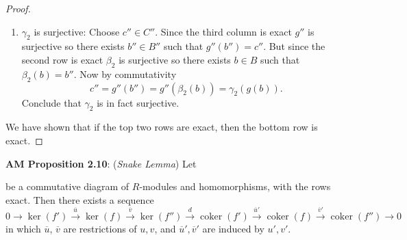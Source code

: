 \documentclass[8pt]{amsart}
\theoremstyle{plain}%
\theoremstyle{definition}
\theoremstyle{remark}
\numberwithin{equation}{section}
\newcommand{\coker}{\operatorname{coker}}
\begin{document}
\begin{proof}
\begin{enumerate}
			\item $\gamma_2$ is surjective: Choose $c'' \in C''$. Since the third column is exact $g''$ is surjective so there exists $b'' \in B''$ such that $g''(b'') = c''$. But since the second row is exact $\beta_2$ is surjective so there exists $b \in B$ such that $\beta_2(b) = b''$. Now by commutativity $$c'' = g''(b'') = g''(\beta_2(b)) = \gamma_2(g(b)).$$ Conclude that $\gamma_2$ is in fact surjective.
		\end{enumerate}
		We have shown that if the top two rows are exact, then the bottom row is exact.
	\end{proof}






\textbf{AM Proposition 2.10}: (\textit{Snake Lemma}) Let

	\begin{center}
	\end{center}

be a commutative diagram of $R$-modules and homomorphisms, with the rows exact. Then there exists a sequence $$0 \rightarrow \ker(f') \xrightarrow{\overline u} \ker(f) \xrightarrow{\overline v} \ker (f'') \xrightarrow d \coker(f') \xrightarrow {\overline u'} \coker (f) \xrightarrow{\overline v'} \coker(f'') \rightarrow 0$$ in which $\overline u$, $\overline v$ are restrictions of $u, v$, and $\overline u', \overline v'$ are induced by $u', v'$.\\
\end{document}
